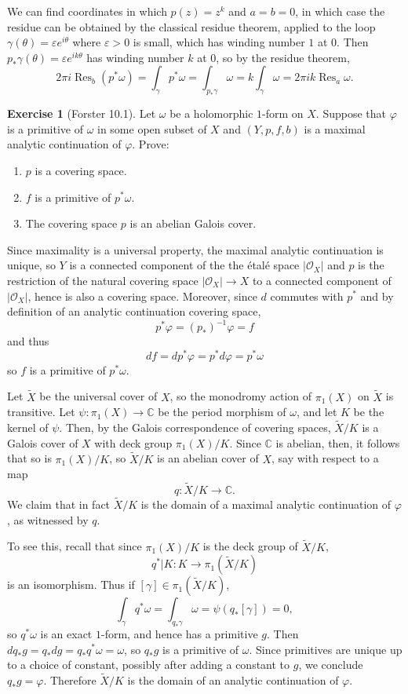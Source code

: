 \documentclass[10pt]{article}
\newcommand{\CC}{\mathbb{C}}
\DeclareMathOperator*{\Res}{Res}
\newcommand{\Olo}{\mathscr O}
\theoremstyle{definition}
\newtheorem{exer}{Exercise}
\begin{document}
We can find coordinates in which $p(z) = z^k$ and $a = b = 0$, in which case the residue can be obtained by the classical residue theorem, applied to the loop $\gamma(\theta) = \varepsilon e^{i\theta}$ where $\varepsilon > 0$ is small, which has winding number $1$ at $0$. Then $p_*\gamma(\theta) = \varepsilon e^{ik\theta}$ has winding number $k$ at $0$, so by the residue theorem,
$$2\pi i \Res_b(p^*\omega) = \int_\gamma p^*\omega = \int_{p_*\gamma} \omega = k\int_\gamma \omega = 2\pi ik \Res_a \omega.$$

\begin{exer}[Forster 10.1]
Let $\omega$ be a holomorphic $1$-form on $X$.
Suppose that $\varphi$ is a primitive of $\omega$ in some open subset of $X$ and $(Y, p, f, b)$ is a maximal analytic continuation of $\varphi$.
Prove:
\begin{enumerate}
\item $p$ is a covering space.
\item $f$ is a primitive of $p^*\omega$.
\item The covering space $p$ is an abelian Galois cover.
\end{enumerate}
\end{exer}

Since maximality is a universal property, the maximal analytic continuation is unique, so $Y$ is a connected component of the the \'etal\'e space $|\Olo_X|$ and $p$ is the restriction of the natural covering space $|\Olo_X| \to X$ to a connected component of $|\Olo_X|$, hence is also a covering space.
Moreover, since $d$ commutes with $p^*$ and by definition of an analytic continuation covering space,
$$p^*\varphi = (p_*)^{-1}\varphi = f$$
and thus
$$df = dp^*\varphi = p^*d\varphi = p^*\omega$$
so $f$ is a primitive of $p^*\omega$.

Let $\tilde X$ be the universal cover of $X$, so the monodromy action of $\pi_1(X)$ on $\tilde X$ is transitive.
Let $\psi: \pi_1(X) \to \CC$ be the period morphism of $\omega$, and let $K$ be the kernel of $\psi$.
Then, by the Galois correspondence of covering spaces, $\tilde X/K$ is a Galois cover of $X$ with deck group $\pi_1(X)/K$.
Since $\CC$ is abelian, then, it follows that so is $\pi_1(X)/K$, so $\tilde X/K$ is an abelian cover of $X$, say with respect to a map
$$q: \tilde X/K \to \CC.$$
We claim that in fact $\tilde X/K$ is the domain of a maximal analytic continuation of $\varphi$, as witnessed by $q$.

To see this, recall that since $\pi_1(X)/K$ is the deck group of $\tilde X/K$,
$$q^*|K: K \to \pi_1(\tilde X/K)$$
is an isomorphism. Thus if $[\gamma] \in \pi_1(\tilde X/K)$,
$$\int_\gamma q^*\omega = \int_{q_*\gamma} \omega = \psi(q_*[\gamma]) = 0,$$
so $q^*\omega$ is an exact $1$-form, and hence has a primitive $g$.
Then $dq_*g = q_*dg = q_*q^*\omega = \omega$, so $q_*g$ is a primitive of $\omega$.
Since primitives are unique up to a choice of constant, possibly after adding a constant to $g$, we conclude $q_*g = \varphi$.
Therefore $\tilde X/K$ is the domain of an analytic continuation of $\varphi$.
\end{document}
